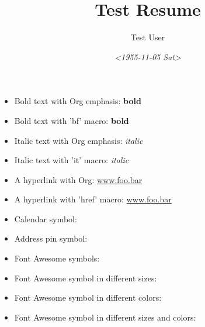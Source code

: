 \documentclass[10pt,letterpaper,ragged2e,withhyper]{altacv}
\author{Test User}
\date{\textit{<1955-11-05 Sat>}}
\title{Test Resume}
\newcommand*{\addresssymbol}{{\color{color2}\small\faMapMarker}~}
\newcommand{\calendarsymbol}{{\color{color2}\small\faCalendar}~}
\begin{document}


\label{sec:org0f0d8ea}


\label{sec:org8bad18f}

\begin{itemize}
\item Bold text with Org emphasis: \textbf{bold}
\item Bold text with 'bf' macro: \textbf{bold}
\item Italic text with Org emphasis: \emph{italic}
\item Italic text with 'it' macro: \emph{italic}
\end{itemize}


\label{sec:orgfe5179c}
\begin{itemize}
\item A hyperlink with Org: \href{https://www.foo.bar}{www.foo.bar}
\item A hyperlink with 'href' macro: \href{https://www.foo.bar}{www.foo.bar}
\end{itemize}


\label{sec:org46935e0}
\begin{itemize}
\item Calendar symbol: \calendarsymbol
\item Address pin symbol: \addresssymbol
\item Font Awesome symbols: {\faCogs} {\faGraduationCap} {\faGraduationCap} {\faBook} {\faWrench} {\faTrophy} {\faChalkboardTeacher} {\faUsers}
\item Font Awesome symbol in different sizes: {\Huge\faBriefcase} {\huge\faBriefcase} {\Large\faBriefcase} {\large\faBriefcase} {\normalsize\faBriefcase} {\small\faBriefcase} {\footnotesize\faBriefcase} {\scriptsize\faBriefcase} {\tiny\faBriefcase}
\item Font Awesome symbol in different colors: {\color{color1}\faBriefcase} {\color{Black}\faBriefcase} {\color{SlateGrey}\faBriefcase} {\color{LightGrey}\faBriefcase} {\color{DarkPastelRed}\faBriefcase} {\color{PastelRed}\faBriefcase} {\color{Blue}\faBriefcase} {\color{DarkBlue}\faBriefcase} {\color{GoldenEarth}\faBriefcase} {\color{CoolSky}\faBriefcase} {\color{SoftSkyBlue}\faBriefcase}
\item Font Awesome symbol in different sizes and colors: {\color{color1}\Huge\faBriefcase} {\color{Black}\huge\faBriefcase} {\color{SlateGrey}\Large\faBriefcase} {\color{LightGrey}\large\faBriefcase} {\color{DarkPastelRed}\normalsize\faBriefcase} {\color{PastelRed}\small\faBriefcase} {\color{Blue}\footnotesize\faBriefcase} {\color{DarkBlue}\scriptsize\faBriefcase} {\color{GoldenEarth}\tiny\faBriefcase}
\end{itemize}
\end{document}
